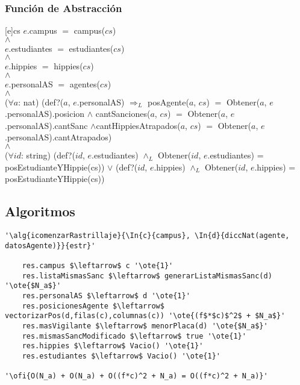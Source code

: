 \pagebreak

\subsubsection{Función de Abstracción}
[e]{cs}{
$e$.campus $=$ campus($cs$) 
\\
$\land$
\\
$e$.estudiantes $=$ estudiantes($cs$)
\\
$\land$
\\
$e$.hippies $=$ hippies($cs$)
\\
$\land$
\\
$e$.personalAS $=$ agentes($cs$)
\\
$\land$
\\
($\forall a$: nat) (def?($a$, $e$.personalAS) $\Rightarrow_L$ posAgente($a$, $cs$) $=$ Obtener($a$, $e$.personalAS).posicion $\land$ cantSanciones($a$, $cs$) $=$ Obtener($a$, $e$.personalAS).cantSanc $\land$cantHippiesAtrapados($a$, $cs$) $=$ Obtener($a$, $e$.personalAS).cantAtrapados)
\\
$\land$
\\
($\forall id$: string) (def?($id$, $e$.estudiantes) $\land_L$ Obtener($id$, $e$.estudiantes) = posEstudianteYHippie(cs)) $\lor$ (def?($id$, $e$.hippies) $\land_L$ Obtener($id$, $e$.hippies) = posEstudianteYHippie(cs))
}

\subsection{Algoritmos}

\lstset{style=alg}

\begin{lstlisting}[mathescape]
'\alg{icomenzarRastrillaje}{\In{c}{campus}, \In{d}{diccNat(agente, datosAgente)}}{estr}' 

	res.campus $\leftarrow$ c '\ote{1}'
	res.listaMismasSanc $\leftarrow$ generarListaMismasSanc(d) '\ote{$N_a$}'
	res.personalAS $\leftarrow$ d '\ote{1}'
	res.posicionesAgente $\leftarrow$ vectorizarPos(d,filas(c),columnas(c)) '\ote{(f$*$c)$^2$ + $N_a$}'
	res.masVigilante $\leftarrow$ menorPlaca(d) '\ote{$N_a$}'
	res.mismasSancModificado $\leftarrow$ true '\ote{1}'
	res.hippies $\leftarrow$ Vacio() '\ote{1}'
	res.estudiantes $\leftarrow$ Vacio() '\ote{1}'

'\ofi{O(N_a) + O(N_a) + O((f*c)^2 + N_a) = O((f*c)^2 + N_a)}'
\end{lstlisting}

